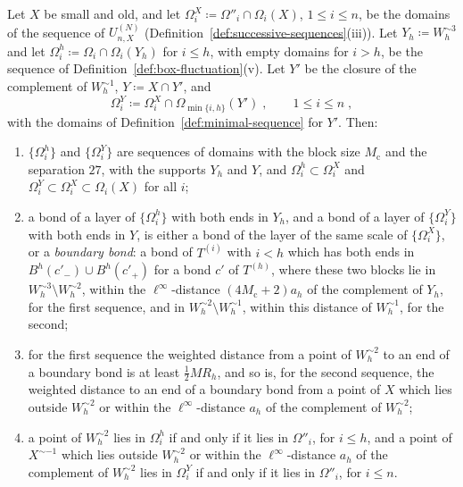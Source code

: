 \documentclass[11pt]{preprint}
\numberwithin{equation}{section}
\begin{document}
\begin{lemma}\label{lem:last-tests-supports}
Let $X$ be small and old, and let $\Omega^X_i \coloneqq \Omega''_i \cap \Omega_i(X)$, $1 \leqslant i \leqslant n$, be the domains of the sequence of $U^{(N)}_{n,X}$ (Definition~\ref{def:successive-sequences}(iii)). Let $Y_h \coloneqq W_h^{\sim3}$ and let $\Omega^h_i \coloneqq \Omega_i \cap \Omega_i(Y_h)$ for $i \leqslant h$, with empty domains for $i > h$, be the sequence of Definition~\ref{def:box-fluctuation}(v). Let $Y'$ be the closure of the complement of $W_h^{\sim1}$, $Y \coloneqq X \cap Y'$, and
\begin{equation}\label{eq:hole-sequence}
    \Omega^Y_i \coloneqq \Omega^X_i \cap \Omega_{\min\{ i, h \}}(Y')\;,
    \qquad
    1 \leqslant i \leqslant n\;,
\end{equation}
with the domains of Definition~\ref{def:minimal-sequence} for $Y'$. Then:
\begin{enumerate}[label=(\roman*)]
\item $\{ \Omega^h_i \}$ and $\{ \Omega^Y_i \}$ are sequences of domains with the block size $M_{\mathrm c}$ and the separation $27$, with the supports $Y_h$ and $Y$, and $\Omega^h_i \subset \Omega^X_i$ and $\Omega^Y_i \subset \Omega^X_i \subset \Omega_i(X)$ for all $i$;
\item a bond of a layer of $\{ \Omega^h_i \}$ with both ends in $Y_h$, and a bond of a layer of $\{ \Omega^Y_i \}$ with both ends in $Y$, is either a bond of the layer of the same scale of $\{ \Omega^X_i \}$, or a \emph{boundary bond}: a bond of $T^{(i)}$ with $i < h$ which has both ends in $B^h(c'_-) \cup B^h(c'_+)$ for a bond $c'$ of $T^{(h)}$, where these two blocks lie in $W_h^{\sim3} \setminus W_h^{\sim2}$, within the $\ell^\infty$-distance $(4M_{\mathrm c} + 2)a_h$ of the complement of $Y_h$, for the first sequence, and in $W_h^{\sim2} \setminus W_h^{\sim1}$, within this distance of $W_h^{\sim1}$, for the second;
\item for the first sequence the weighted distance from a point of $W_h^{\sim2}$ to an end of a boundary bond is at least $\frac{1}{2}MR_h$, and so is, for the second sequence, the weighted distance to an end of a boundary bond from a point of $X$ which lies outside $W_h^{\sim2}$ or within the $\ell^\infty$-distance $a_h$ of the complement of $W_h^{\sim2}$;
\item a point of $W_h^{\sim2}$ lies in $\Omega^h_i$ if and only if it lies in $\Omega''_i$, for $i \leqslant h$, and a point of $X^{\sim-1}$ which lies outside $W_h^{\sim2}$ or within the $\ell^\infty$-distance $a_h$ of the complement of $W_h^{\sim2}$ lies in $\Omega^Y_i$ if and only if it lies in $\Omega''_i$, for $i \leqslant n$.
\end{enumerate}
\end{lemma}
\end{document}
